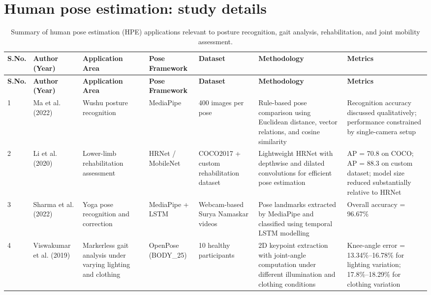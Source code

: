 \documentclass[12pt]{elsarticle}
\begin{document}
\section{Human pose estimation: study details}
\label{supp:S6}
{\scriptsize
\setlength{\tabcolsep}{3pt}
\renewcommand{\arraystretch}{1.08}
\begin{center}
\begin{longtable}{m{0.7cm} m{2.2cm} m{2.2cm} m{2.0cm} m{2.1cm} m{3.0cm} m{2.8cm}}
\caption{Summary of human pose estimation (HPE) applications relevant to posture recognition, gait analysis, rehabilitation, and joint mobility assessment.}
\label{HPE} \\
\hline
\textbf{S.No.} & \textbf{Author (Year)} & \textbf{Application Area} & \textbf{Pose Framework} & \textbf{Dataset} & \textbf{Methodology} & \textbf{Metrics} \\
\hline
\endfirsthead

\hline
\textbf{S.No.} & \textbf{Author (Year)} & \textbf{Application Area} & \textbf{Pose Framework} & \textbf{Dataset} & \textbf{Methodology} & \textbf{Metrics} \\
\hline
\endhead

1 & Ma et al. (2022) \cite{ma2022wushu} 
& Wushu posture recognition 
& MediaPipe 
& 400 images per pose 
& Rule-based pose comparison using Euclidean distance, vector relations, and cosine similarity 
& Recognition accuracy discussed qualitatively; performance constrained by single-camera setup \\ \hline

2 & Li et al. (2020) \cite{li2020human} 
& Lower-limb rehabilitation assessment 
& HRNet / MobileNet 
& COCO2017 + custom rehabilitation dataset 
& Lightweight HRNet with depthwise and dilated convolutions for efficient pose estimation 
& AP = 70.8 on COCO; AP = 88.3 on custom dataset; model size reduced substantially relative to HRNet \\ \hline

3 & Sharma et al. (2022) \cite{sharma2022surya} 
& Yoga pose recognition and correction 
& MediaPipe + LSTM 
& Webcam-based Surya Namaskar videos 
& Pose landmarks extracted by MediaPipe and classified using temporal LSTM modelling 
& Overall accuracy = 96.67\% \\ \hline

4 & Viswakumar et al. (2019) \cite{viswakumar2019human} 
& Markerless gait analysis under varying lighting and clothing 
& OpenPose (BODY\_25) 
& 10 healthy participants 
& 2D keypoint extraction with joint-angle computation under different illumination and clothing conditions 
& Knee-angle error = 13.34\%--16.78\% for lighting variation; 17.8\%--18.29\% for clothing variation \\ \hline


\end{longtable}
\end{center}}
\end{document}
